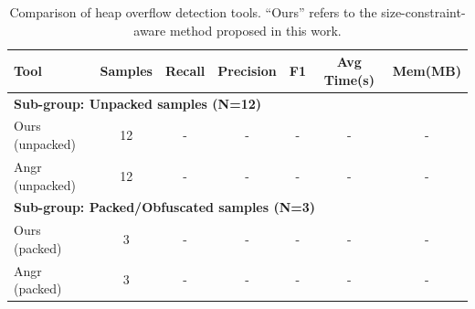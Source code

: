 \begin{table}[htbp]
\centering
\caption{Comparison of heap overflow detection tools. ``Ours'' refers to the size-constraint-aware method proposed in this work.}
\label{tab:comparison}
\begin{tabular}{lcccccc}
\toprule
Tool & Samples & Recall & Precision & F1 & Avg Time(s) & Mem(MB) \\
\midrule
\midrule
\multicolumn{7}{l}{\textbf{Sub-group: Unpacked samples (N=12)}} \\
Ours (unpacked) & 12 & - & - & - & - & - \\
Angr (unpacked)  & 12 & - & - & - & - & - \\
\midrule
\multicolumn{7}{l}{\textbf{Sub-group: Packed/Obfuscated samples (N=3)}} \\
Ours (packed)    & 3  & - & - & - & - & - \\
Angr (packed)     & 3  & - & - & - & - & - \\
\bottomrule
\end{tabular}
\end{table}